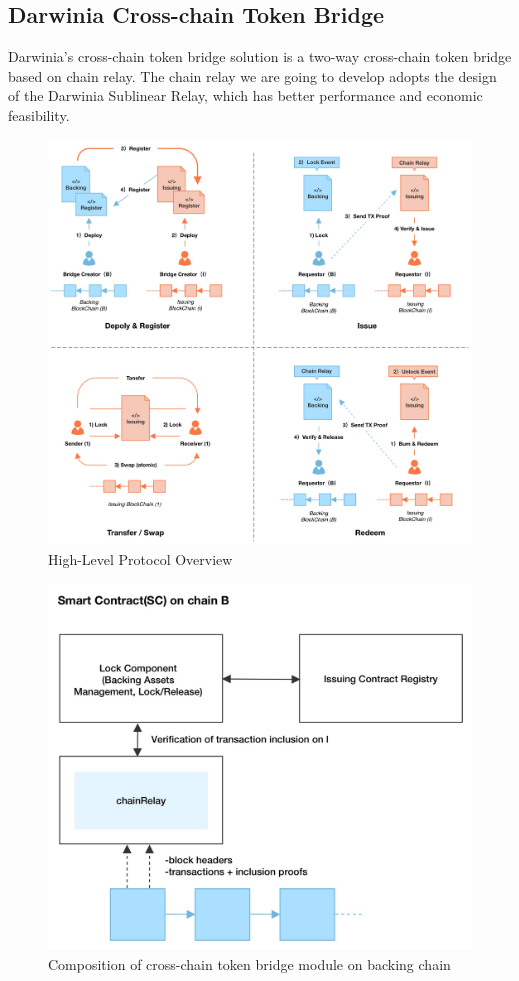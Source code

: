 \subsection*{Darwinia Cross-chain Token Bridge}


Darwinia's cross-chain token bridge solution is a two-way cross-chain token bridge based on chain relay. The chain relay we are going to develop adopts the design of the Darwinia Sublinear Relay, which has better performance and economic feasibility.

\begin{figure}
\centering
\includegraphics[scale=0.2]{pic/High-Level Protocol Overview.jpg}
\caption{High-Level Protocol Overview}
\label{fig:picture001}
\end{figure}

\begin{figure}
\centering
\includegraphics[scale=0.2]{pic/Smart Contract(SC) on chain B.jpg}
\caption{Composition of cross-chain token bridge module on backing chain}
\label{fig:picture001}
\end{figure}

